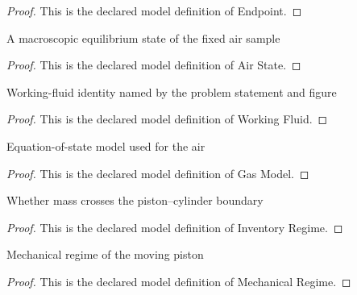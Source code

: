 \begin{proof}
  This is the declared model definition of Endpoint.
\end{proof}
\begin{definition}
  \label{def:physics:phyx-mini-0460:phyxminiproblems-problemphyxmini0460-airstate}
  A macroscopic equilibrium state of the fixed air sample
\end{definition}
\begin{proof}
  This is the declared model definition of Air State.
\end{proof}
\begin{definition}
  \label{def:physics:phyx-mini-0460:phyxminiproblems-problemphyxmini0460-workingfluid}
  Working-fluid identity named by the problem statement and figure
\end{definition}
\begin{proof}
  This is the declared model definition of Working Fluid.
\end{proof}
\begin{definition}
  \label{def:physics:phyx-mini-0460:phyxminiproblems-problemphyxmini0460-gasmodel}
  Equation-of-state model used for the air
\end{definition}
\begin{proof}
  This is the declared model definition of Gas Model.
\end{proof}
\begin{definition}
  \label{def:physics:phyx-mini-0460:phyxminiproblems-problemphyxmini0460-inventoryregime}
  Whether mass crosses the piston--cylinder boundary
\end{definition}
\begin{proof}
  This is the declared model definition of Inventory Regime.
\end{proof}
\begin{definition}
  \label{def:physics:phyx-mini-0460:phyxminiproblems-problemphyxmini0460-mechanicalregime}
  Mechanical regime of the moving piston
\end{definition}
\begin{proof}
  This is the declared model definition of Mechanical Regime.
\end{proof}
